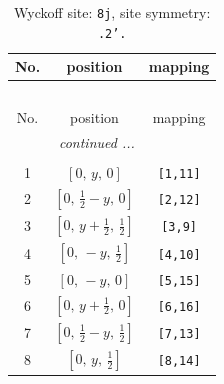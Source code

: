 \documentclass[fleqn,8pt]{jsarticle}
\begin{document}
\begin{longtable}{ccc}
\caption{Wyckoff site: {\tt 8j}, site symmetry: {\tt .2'.}}
 \\
 \hline \hline
No. & position & mapping \\ \hline \endfirsthead

\multicolumn{2}{l}{\tablename\ \thetable{}} \\
 \hline \hline
No. & position & mapping \\ \hline \endhead

 \hline \hline
\multicolumn{2}{r}{\footnotesize\it continued ...} \\ \endfoot

 \hline \hline
\multicolumn{2}{r}{} \\ \endlastfoot

1 & $\left[ 0,\, y,\, 0 \right]$ & {\tt [1,11]} \\ \hline
2 & $\left[ 0,\, \frac{1}{2} - y,\, 0 \right]$ & {\tt [2,12]} \\ \hline
3 & $\left[ 0,\, y + \frac{1}{2},\, \frac{1}{2} \right]$ & {\tt [3,9]} \\ \hline
4 & $\left[ 0,\, - y,\, \frac{1}{2} \right]$ & {\tt [4,10]} \\ \hline
5 & $\left[ 0,\, - y,\, 0 \right]$ & {\tt [5,15]} \\ \hline
6 & $\left[ 0,\, y + \frac{1}{2},\, 0 \right]$ & {\tt [6,16]} \\ \hline
7 & $\left[ 0,\, \frac{1}{2} - y,\, \frac{1}{2} \right]$ & {\tt [7,13]} \\ \hline
8 & $\left[ 0,\, y,\, \frac{1}{2} \right]$ & {\tt [8,14]} \\
\end{longtable}
\renewcommand{\arraystretch}{1.2}
\end{document}
